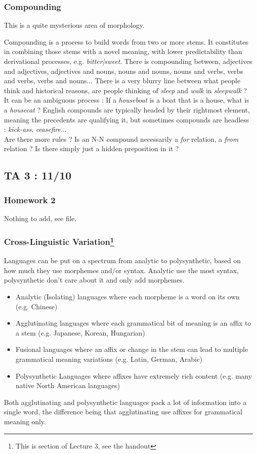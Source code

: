 \documentclass{cours}
\begin{document}
\subsubsection{Compounding}
This is a quite mysterious area of morphology.

Compounding is a process to build words from two or more stems. It constitutes in combining those stems with a novel meaning, with lower predictability than derivational processes, e.g. \textsl{bitter|sweet}. There is compounding between, adjectives and adjectives, adjectives and nouns, nouns and nouns, nouns and verbs, verbs and verbs, verbs and nouns... There is a very blurry line between what people think and historical reasons, are people thinking of \textsl{sleep} and \textsl{walk} in \textsl{sleepwalk} ?\\
It can be an ambiguous process\! : If a \textsl{houseboat} is a boat that is a house, what is a \textsl{housecat} ? English compounds are typically headed by their rightmost element, meaning the precedents are qualifying it, but sometimes compounds are headless\! : \textsl{kick-ass}, \textsl{ceasefire}...\\
Are there more rules ? Is an N-N compound necessarily a \textit{for} relation, a \textit{from} relation ? Is there simply just a hidden preposition in it ?


\subsection{TA 3\! : 11/10}
\subsubsection{Homework 2}
Nothing to add, see file.

\subsubsection[Cross-Linguistic Variation]{Cross-Linguistic Variation\footnote{This is section of Lecture 3, see the handout}}
Languages can be put on a spectrum from analytic to polysynthetic, based on how much they use morphemes and/or syntax.
Analytic use the most syntax, polysynthetic don't care about it and only add morphemes.
\begin{itemize}
    \item Analytic (Isolating) languages where each morpheme is a word on its own (e.g. Chinese)
    \item Agglutinating languages where each grammatical bit of meaning is an affix to a stem (e.g. Japanese, Korean, Hungarian)
    \item Fusional languages where an affix or change in the stem can lead to multiple grammatical meaning variations (e.g. Latin, German, Arabic)
    \item Polysynthetic Languages where affixes have extremely rich content (e.g. many native North American languages)
\end{itemize}
Both agglutinating and polysynthetic languages pack a lot of information into a single word, the difference being that agglutinating use affixes for grammatical meaning only.
\end{document}
